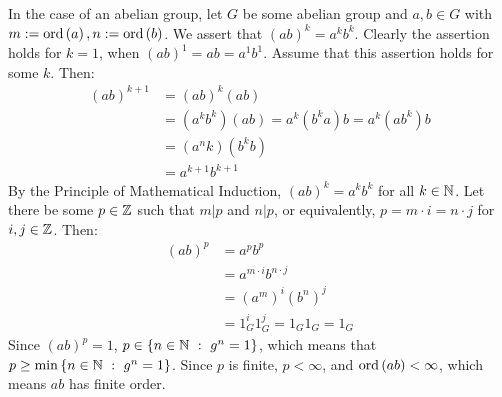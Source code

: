 \documentclass{article}
\begin{document}
In the case of an abelian group, let $G$ be some abelian group and $a, b \in G$ with $m := \operatorname{ord}\left(a\right), n := \operatorname{ord}\left(b\right)$. We assert that $\left(ab\right)^k = a^kb^k$. Clearly the assertion holds for $k = 1$, when $\left(ab\right)^1 = ab = a^1b^1$. Assume that this assertion holds for some $k$. Then:
\begin{equation}
    \begin{split}
        \left(ab\right)^{k + 1} & = \left(ab\right)^k\left(ab\right) \\
        & = \left(a^kb^k\right)\left(ab\right) = a^k\left(b^ka\right)b = a^k\left(ab^k\right)b \\
        & = \left(a^nk\right)\left(b^kb\right) \\
        & = a^{k+1}b^{k+1}
    \end{split}
\end{equation}
By the Principle of Mathematical Induction, $\left(ab\right)^k = a^kb^k$ for all $k \in \mathbb{N}$. Let there be some $p \in \mathbb{Z}$ such that $m|p$ and $n|p$, or equivalently, $p = m \cdot i = n \cdot j$ for $i, j \in \mathbb{Z}$. Then:
\begin{equation}
    \begin{split}
        \left(ab\right)^p & = a^pb^p \\
        & = a^{m \cdot i}b^{n \cdot j} \\
        & = \left(a^m\right)^i\left(b^n\right)^j \\
        & = 1_G^i1_G^j = 1_G1_G = 1_G
    \end{split}
\end{equation}
Since $\left(ab\right)^p = 1$, $p \in \left\{ n\in \mathbb{N} \ : \  g^n = 1 \right\}$, which means that $p \geq \min\left\{ n\in \mathbb{N} \ : \  g^n = 1 \right\}$. Since $p$ is finite, $p < \infty$, and $\operatorname{ord}\left(ab\right) < \infty$, which means $ab$ has finite order.

\newpage

\end{document}
